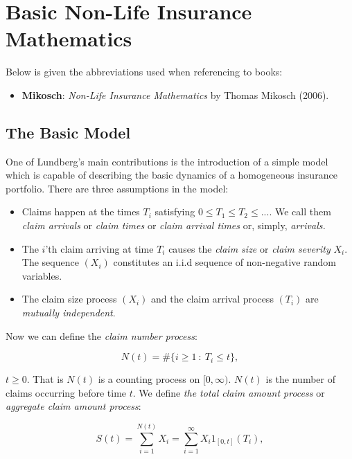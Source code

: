 \documentclass[a4paper,12pt,openany]{book}
\providecommand{\tightlist}{%
 \setlength{\itemsep}{0pt}\setlength{\parskip}{0pt}}
\begin{document}
\hypertarget{basic-non-life-insurance-mathematics}{%
\chapter{Basic Non-Life Insurance Mathematics}\label{basic-non-life-insurance-mathematics}}

Below is given the abbreviations used when referencing to books:

\begin{itemize}
\tightlist
\item
  \textbf{Mikosch}: \emph{Non-Life Insurance Mathematics} by Thomas Mikosch (2006).\cite{mikosch2009}
\end{itemize}

\hypertarget{the-basic-model}{%
\section{The Basic Model}\label{the-basic-model}}

One of Lundberg's main contributions is the introduction of a simple model which is capable of describing the basic dynamics of a homogeneous insurance portfolio. There are three assumptions in the model:

\begin{itemize}
\tightlist
\item
  Claims happen at the times \(T_i\) satisfying \(0\le T_1 \le T_2 \le...\). We call them \emph{claim arrivals} or \emph{claim times} or \emph{claim arrival times} or, simply, \emph{arrivals.}
\item
  The \(i\)'th claim arriving at time \(T_i\) causes the \emph{claim size} or \emph{claim severity} \(X_i\). The sequence \((X_i)\) constitutes an i.i.d sequence of non-negative random variables.
\item
  The claim size process \((X_i)\) and the claim arrival process \((T_i)\) are \emph{mutually independent}.
\end{itemize}

Now we can define the \emph{claim number process}:

\[
N(t)=\#\{i\ge 1\ :\ T_i\le t\},
\]

\(t\ge 0\). That is \(N(t)\) is a counting process on \([0,\infty)\). \(N(t)\) is the number of claims occurring before time \(t\). We define \emph{the total claim amount process} or \emph{aggregate claim amount process}:

\[
S(t)=\sum_{i=1}^{N(t)}X_i=\sum_{i=1}^\infty X_i 1_{[0,t]}(T_i),
\]
\end{document}
